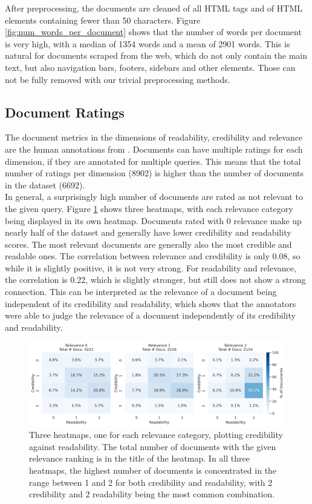 After preprocessing, the documents are cleaned of all HTML tags and of HTML elements containing fewer than 50 characters.
Figure \ref{fig:num_words_per_document} shows that the number of words per document is very high, with a median of 1354 words and a mean of 2901 words.
This is natural for documents scraped from the web, which do not only contain the main text, but also navigation bars, footers, sidebars and other elements.
Those can not be fully removed with our trivial preprocessing methods.
\subsection{Document Ratings}
The document metrics in the dimensions of readability, credibility and relevance are the human annotations from \cite{goeuriot:2021}.
Documents can have multiple ratings for each dimension, if they are annotated for multiple queries.
This means that the total number of ratings per dimension (8902) is higher than the number of documents in the dataset (6692).
\\

In general, a surprisingly high number of documents are rated as not relevant to the given query.
Figure \ref{fig:heatmap_rel_cred_read} shows three heatmaps, with each relevance category being displayed in its own heatmap.
Documents rated with 0 relevance make up nearly half of the dataset and generally have lower credibility and readability scores.
The most relevant documents are generally also the most credible and readable ones.
The correlation between relevance and credibility is only 0.08, so while it is slightly positive, it is not very strong.
For readability and relevance, the correlation is 0.22, which is slightly stronger, but still does not show a strong connection.
This can be interpreted as the relevance of a document being independent of its credibility and readability, which shows that the annotators were able to judge the relevance of a document independently of its credibility and readability.
\begin{figure}
\centering
\includegraphics[width=\textwidth]{images/heatmap_qrels.png}
\caption{Three heatmaps, one for each relevance category, plotting credibility against readability.
The total number of documents with the given relevance ranking is in the title of the heatmap.
In all three heatmaps, the highest number of documents is concentrated in the range between 1 and 2 for both credibility and readability, with 2 credibility and 2 readability being the most common combination.
}
\label{fig:heatmap_rel_cred_read}
\end{figure}

